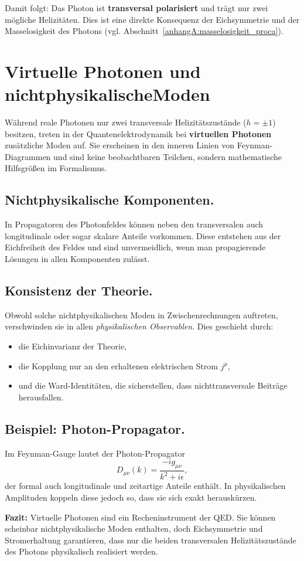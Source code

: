 \medskip
Damit folgt: Das Photon ist \textbf{transversal polarisiert}
und trägt nur zwei mögliche Helizitäten.  
Dies ist eine direkte Konsequenz der Eichsymmetrie und der
Masselosigkeit des Photons 
(vgl. Abschnitt~\ref{anhangA:masselosigkeit_proca}).
\section{Virtuelle Photonen und nichtphysikalische\newline  Moden}
\label{anhangA:virtuelle_moden}

Während reale Photonen nur zwei transversale Helizitätszustände 
(\( h = \pm 1 \)) besitzen, treten in der Quantenelektrodynamik 
bei \textbf{virtuellen Photonen} zusätzliche Moden auf. 
Sie erscheinen in den inneren Linien von Feynman-Diagrammen und 
sind keine beobachtbaren Teilchen, sondern mathematische Hilfsgrößen 
im Formalismus.

\subsection*{Nichtphysikalische Komponenten.}
In Propagatoren des Photonfeldes können neben den transversalen
auch longitudinale oder sogar skalare Anteile vorkommen.  
Diese entstehen aus der Eichfreiheit des Feldes 
und sind unvermeidlich, wenn man propagierende Lösungen in allen 
Komponenten zulässt.

\subsection*{Konsistenz der Theorie.}
Obwohl solche nichtphysikalischen Moden in Zwischenrechnungen 
auftreten, verschwinden sie in allen \emph{physikalischen Observablen}.  
Dies geschieht durch:
\begin{itemize}
	\item die Eichinvarianz der Theorie,
	\item die Kopplung nur an den erhaltenen elektrischen Strom \( j^\mu \),
	\item und die Ward-Identitäten, die sicherstellen, 
	dass nichttransversale Beiträge herausfallen.
\end{itemize}

\subsection*{Beispiel: Photon-Propagator.}
Im Feynman-Gauge lautet der Photon-Propagator
\[
D_{\mu\nu}(k) = \frac{-i g_{\mu\nu}}{k^2 + i\epsilon} ,
\]
der formal auch longitudinale und zeitartige Anteile enthält.  
In physikalischen Amplituden koppeln diese jedoch so,
dass sie sich exakt herauskürzen.

\medskip
\textbf{Fazit:}  
Virtuelle Photonen sind ein Recheninstrument der QED.  
Sie können scheinbar nichtphysikalische Moden enthalten, 
doch Eichsymmetrie und Stromerhaltung garantieren, 
dass nur die beiden transversalen Helizitätszustände des Photons 
physikalisch realisiert werden.
